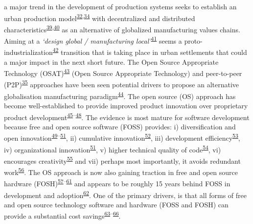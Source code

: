 \documentclass[
  12pt,
  a4paperpaper,
  onecolumn]{article}
\begin{document}
a major trend in the development of production systems seeks to
establish an urban production
model\textsuperscript{\protect\hyperlink{ref-Herrmann2020}{32},\protect\hyperlink{ref-juraschek2022}{34}}
with decentralized and distributed
characteristics\textsuperscript{\protect\hyperlink{ref-priavolou2022}{39},\protect\hyperlink{ref-cerdas2017}{40}}
as an alternative of globalized manufacturing values chains. Aiming at a
\emph{`design global / manufacturing
local'}\textsuperscript{\protect\hyperlink{ref-Kostakis2018}{41}} seems
a
proto-industrialization\textsuperscript{\protect\hyperlink{ref-sabel1985}{42}}
transition that is taking place in urban settlements that could a major
impact in the next short future. The Open Source Appropriate Technology
(OSAT)\textsuperscript{\protect\hyperlink{ref-Pearce2010}{43}} (Open
Source Appropriate Technology) and peer-to-peer
(P2P)\textsuperscript{\protect\hyperlink{ref-Kostakis2013}{35}}
approaches have been seen potential drivers to propose an alternative
globalisation manufacturing
paradigm\textsuperscript{\protect\hyperlink{ref-Heikkinen2020a}{44}}.
The open source (OS) approach has become well-established to provide
improved product innovation over proprietary product
development\textsuperscript{\protect\hyperlink{ref-dibona1999}{45}--\protect\hyperlink{ref-deek2007}{48}}.
The evidence is most mature for software development because free and
open source software (FOSS) provides: i) diversification and open
innovation\textsuperscript{\protect\hyperlink{ref-colombo2014}{49}--\protect\hyperlink{ref-alexy2013}{51}},
ii) cumulative
innovation\textsuperscript{\protect\hyperlink{ref-boudreau2016}{52}},
iii) development
efficiency\textsuperscript{\protect\hyperlink{ref-hienerth2014}{53}},
iv) organizational
innovation\textsuperscript{\protect\hyperlink{ref-alexy2013}{51}}, v)
higher technical quality of
code\textsuperscript{\protect\hyperlink{ref-soderberg2015}{54}}, vi)
encourages
creativity\textsuperscript{\protect\hyperlink{ref-martinez2015}{55}} and
vii) perhaps most importantly, it avoids redundant
work\textsuperscript{\protect\hyperlink{ref-Ardal2016}{56}}. The OS
approach is now also gaining traction in free and open source hardware
(FOSH)\textsuperscript{\protect\hyperlink{ref-thompson2011}{57}--\protect\hyperlink{ref-li2018}{61}}
and appears to be roughly 15 years behind FOSS in development and
adoption\textsuperscript{\protect\hyperlink{ref-pearce2018}{62}}. One of
the primary drivers, is that all forms of free and open source
technology software and hardware (FOSS and FOSH) can provide a
substantial cost
savings\textsuperscript{\protect\hyperlink{ref-petch2014}{63}--\protect\hyperlink{ref-wittbrodt2013}{66}}.
\end{document}
